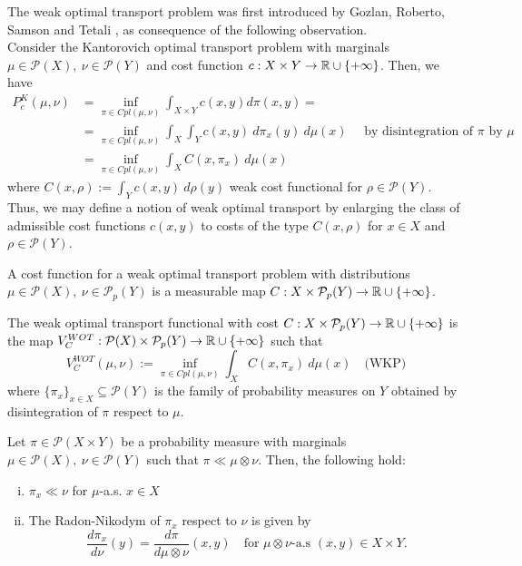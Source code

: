 \documentclass[../main.tex]{subfiles}
\begin{document}
The weak optimal transport problem was first introduced by Gozlan, Roberto, Samson and Tetali \cite{gozlan2017kantorovich}, as consequence of the following observation. \\
Consider the Kantorovich optimal transport problem with marginals $\mu\in\mathcal{P}(X), \ \nu\in\mathcal{P}(Y)$ and cost function $c: X \times Y \to \mathbb{R}\cup\{+\infty\}$. Then, we have
\begin{align*}
    P^K_c(\mu, \nu) &= \inf_{\pi\in Cpl(\mu, \nu)} \int_{X\times Y} c(x, y) d\pi(x, y) = \\
    &= \inf_{\pi\in Cpl(\mu, \nu)} \int_X \int_Y c(x, y) \ d\pi_x(y) \ d\mu(x) \quad \text{ by disintegration of $\pi$ by $\mu$} \\
    &= \inf_{\pi\in Cpl(\mu, \nu)} \int_X C(x, \pi_x) \ d\mu(x)
\end{align*}
where $C(x, \rho) := \int_Y c(x, y) \ d\rho(y)$ weak cost functional for $\rho\in\mathcal{P}(Y)$. \\
Thus, we may define a notion of weak optimal transport by enlarging the class of admissible cost functions $c(x, y)$ to costs of the type $C(x, \rho)$ for $x\in X$ and $\rho\in\mathcal{P}(Y)$. 

\begin{definition}
    A cost function for a weak optimal transport problem with distributions $\mu\in\mathcal{P}(X), \ \nu\in\mathcal{P}_p(Y)$ is a measurable map $C: X \times \mathcal{P}_p(Y) \to \mathbb{R}\cup\{+\infty\}$.
\end{definition}

\begin{definition}
    The weak optimal transport functional with cost $C:X\times \mathcal{P}_p(Y)\to\mathbb{R}\cup\{+\infty\}$ is the map $V^{WOT}_C : \mathcal{P}(X)\times\mathcal{P}_p(Y)\to\mathbb{R}\cup\{+\infty\}$ such that
    $$
    V^{WOT}_C(\mu, \nu) := \inf_{\pi\in Cpl(\mu, \nu)} \int_X C(x, \pi_x) \ d\mu(x) 
    \quad \text{(WKP)}
    $$
    where $\{\pi_x\}_{x\in X}\subseteq \mathcal{P}(Y)$ is the family of probability measures on $Y$ obtained by disintegration of $\pi$ respect to $\mu$. 
\end{definition}

\begin{lemma}
    Let $\pi\in\mathcal{P}(X\times Y)$ be a probability measure with marginals $\mu\in\mathcal{P}(X), \ \nu\in\mathcal{P}(Y)$ such that $\pi \ll \mu\otimes\nu$. Then, the following hold:
    \begin{enumerate}[(i)]
        \item $\pi_x \ll \nu$ for $\mu$-a.s. $x\in X$
        \item The Radon-Nikodym of $\pi_x$ respect to $\nu$ is given by
        $$
        \frac{d\pi_x}{d\nu}(y) = \frac{d\pi}{d\mu\otimes\nu} (x,y) \quad \text{for $\mu\otimes\nu$-a.s $(x,y)\in X\times Y$}.
        $$
    \end{enumerate}
\end{lemma}
\end{document}
